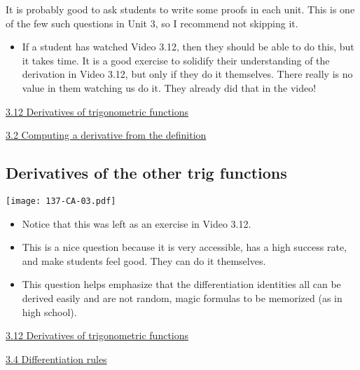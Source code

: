\documentclass[11pt]{article}
\newcommand{\nl}{\hfill \vspace{-1.1\baselineskip}} %
\newcommand{\vii}{\hspace{8mm} \href{https://www.youtube.com/watch?v=eNcg9cKzV1Q&list=PLlwePzQY_wW8qiZD6XYqCnibdY37ygbx7&index=2}{3.2 Computing a derivative from the definition}}
\newcommand{\viv}{\hspace{8mm} \href{https://www.youtube.com/watch?v=k_VxtK1U9jk&list=PLlwePzQY_wW8qiZD6XYqCnibdY37ygbx7&index=4}{3.4 Differentiation rules}}
\newcommand{\vxii}{\hspace{8mm} \href{https://www.youtube.com/watch?v=E_Cvb53vXI0&list=PLlwePzQY_wW8qiZD6XYqCnibdY37ygbx7&index=12}{3.12 Derivatives of trigonometric functions}}
\begin{document}
\begin{warning}
	It is probably good to ask students to write some proofs in each unit.  This is one of the few such questions in Unit 3, so I recommend not skipping it.
\end{warning}

\begin{comments}
\nl
	\begin{itemize}
		\item If a student has watched Video 3.12, then they should be able to do this, but it takes time.  It is a good exercise to solidify their understanding of the derivation in Video 3.12, but only if they do it themselves.  There really is no value in them watching us do it.  They already did that in the video!
	\end{itemize}
\end{comments}

\begin{videos}
\vxii

\vii
\end{videos}

\newpage


\subsection{Derivatives of the other trig functions} 

\begin{center}
{ \texttt{[image: 137-CA-03.pdf]}} 
\end{center}


\begin{comments}
\nl
	\begin{itemize}
		\item Notice that this was left as an exercise in Video 3.12.
		\item  This is a nice question because it is very accessible, has a high success rate, and make students feel good.  They can do it themselves.
		\item  This question helps emphasize that the differentiation identities all can be derived easily and are not random, magic formulas to be memorized (as in high school).
	\end{itemize}	
\end{comments}

\begin{videos}
\vxii

\viv
\end{videos}
\end{document}

